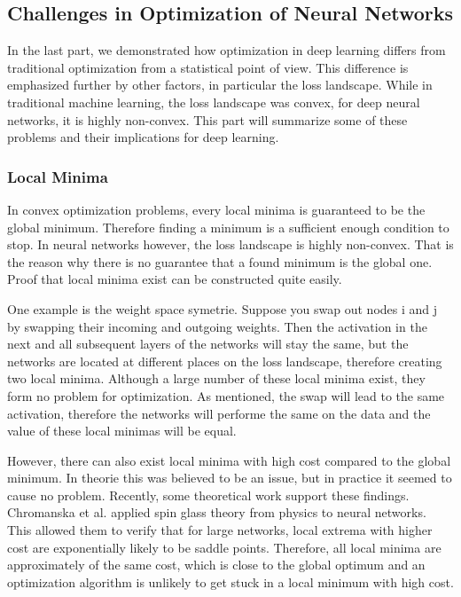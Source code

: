 \subsection{Challenges in Optimization of Neural Networks}
In the last part, we demonstrated how optimization in deep learning differs from
traditional optimization from a statistical point of view. This difference is
emphasized further by other factors, in particular the loss landscape. While in
traditional machine learning, the loss landscape was convex, for deep neural
networks, it is highly non-convex. This part will summarize some of these
problems and their implications for deep learning.


\subsubsection{Local Minima}\label{sub:Local_minima}
In convex optimization problems, every local minima is guaranteed to be the
global minimum. Therefore finding a minimum is a sufficient enough condition to
stop. In neural networks however, the loss landscape is highly non-convex. That
is the reason why there is no guarantee that a found minimum is the global one.
Proof that local minima exist can be constructed quite easily.

One example is the weight space symetrie. Suppose you swap out nodes i and j by
swapping their incoming and outgoing weights. Then the activation in the next
and all subsequent layers of the networks will stay the same, but the networks
are located at different places on the loss landscape, therefore creating two
local minima. Although a large number of these local minima exist, they form no
problem for optimization. As mentioned, the swap will lead to the same
activation, therefore the networks will performe the same on the data and the
value of these local minimas will be equal.

However, there can also exist local minima with high cost compared to the global
minimum. In theorie this was believed to be an issue, but in practice it seemed
to cause no problem. Recently, some theoretical work support these findings.
Chromanska et al. \cite{choromanska2015loss} applied spin glass theory from
physics to neural networks. This allowed them to verify that for large networks,
local extrema with higher cost are exponentially likely to be saddle points.
Therefore, all local minima are approximately of the same cost, which is close
to the global optimum and an optimization algorithm is unlikely to get stuck in
a local minimum with high cost.

